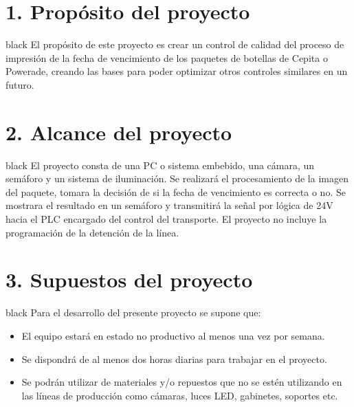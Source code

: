 \documentclass[11pt]{charter}
\begin{document}
\section{1. Propósito del proyecto}
\label{sec:proposito}

\begin{consigna}{black}
El propósito de este proyecto es crear un control de calidad del proceso de impresión de la fecha de vencimiento de los paquetes de botellas de Cepita o Powerade, creando las bases para poder optimizar otros controles similares en un futuro.

\end{consigna}

\section{2. Alcance del proyecto}
\label{sec:alcance}

\begin{consigna}{black}
El proyecto consta de una PC o sistema embebido, una cámara, un semáforo y un sistema de
iluminación. \newline
Se realizará el procesamiento de la imagen del paquete, tomara la decisión de si la fecha de vencimiento es correcta o no. \newline
Se mostrara el resultado en un semáforo y transmitirá la señal por lógica de 24V hacia el PLC encargado del control del transporte. El proyecto no incluye la programación de la detención de la línea.
%
%
%
%
\end{consigna}


\section{3. Supuestos del proyecto}
\label{sec:supuestos}

\begin{consigna}{black}
Para el desarrollo del presente proyecto se supone que:

\begin{itemize}
\item El equipo estará en estado no productivo al menos una vez por semana.
\item Se dispondrá de al menos dos horas diarias para trabajar en el proyecto.
\item Se podrán utilizar de materiales y/o repuestos que no se estén utilizando en las líneas de producción como cámaras, luces LED, gabinetes, soportes etc.

\end{itemize}

\end{consigna}
\end{document}
